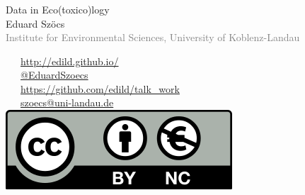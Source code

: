 \documentclass[12pt, t]{beamer}
\begin{document}
\begin{frame}
\frametitle{}
\vspace{1em}
\begin{centering}
\Large \textcolor{title}{Data in Eco(toxico)logy} \\[1em]
Eduard Szöcs \\[0.3em]
\tiny \textcolor{gray}{Institute for Environmental Sciences, University of Koblenz-Landau} \\[5em]
\end{centering}
\normalsize
\textcolor{hilight}{\faLaptop}~~~\href{http://edild.github.io/}{http://edild.github.io/ }\\[.5em]
\textcolor{hilight}{\faTwitter}~~~\href{http://twitter.com/EduardSzoecs}{@EduardSzoecs} 	\\[0.5em]
\textcolor{hilight}{\faGift}~~~\href{https://github.com/edild/talk_work}{https://github.com/edild/talk\_work}\\[0.5em]
\textcolor{hilight}{\faEnvelope}~~~\href{mailto:szoecs@uni-landau.de}{szoecs@uni-landau.de} \\[.5em]
\hfill \includegraphics[width =.3\textwidth]{fig/Cc-by-nc_euro_icon.png} 
\end{frame}
\end{document}
